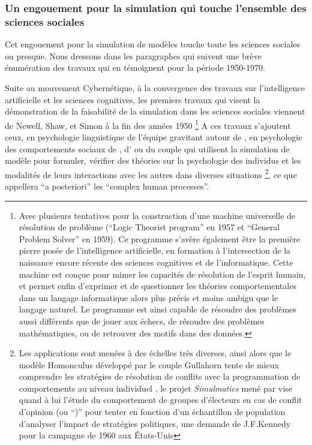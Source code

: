 \subsubsection{Un engouement pour la simulation qui touche l'ensemble des sciences sociales}
\label{ssec:engouement_sciencesociale}

Cet engouement pour la simulation de modèles touche toute les sciences sociales ou presque. Nous dressons dans les paragraphes qui suivent une brève énumération des travaux qui en témoignent pour la période 1950-1970.

Suite au mouvement Cybernétique, à la convergence des travaux sur l'intelligence artificielle et les sciences cognitives, les premiers travaux qui visent la démonstration de la faisabilité de la simulation dans les sciences sociales viennent de Newell, Shaw, et Simon à la fin des années 1950 \autocite{Gullahorn1965} \footnote{Avec plusieurs tentatives pour la construction d'une machine universelle de résolution de problème (\foreignquote{english}{Logic Theorist program} en 1957 et \foreignquote{english}{General Problem Solver} en 1959). Ce programme s'avère également être la première pierre posée de l'intelligence artificielle, en formation à l'intersection de la naissance encore récente des sciences cognitives et de l'informatique. Cette machine est conçue pour mimer les capacités de résolution de l'esprit humain, et permet enfin d'exprimer et de questionner les théories comportementales dans un langage informatique alors plus précis et moins ambigu que le langage naturel. Le programme est ainsi capable de résoudre des problèmes aussi différents que de jouer aux échecs, de résoudre des problèmes mathématiques, ou de retrouver des motifs dans des données.} A ces travaux s'ajoutent ceux, en psychologie linguistique de l'équipe gravitant autour de \textcite[280-416]{Borko1962}, en psychologie des comportements sociaux de \textcite{Hovland1960}, d'\textcite{Abelson1961, Abelson1968} ou du couple \autocite{Gullahorn1965a} qui utilisent la simulation de modèle pour formuler, vérifier des théories sur la psychologie des individus et les modalités de leurs interactions avec les autres dans diverses situations \footnote{Les applications sont menées à des échelles très diverses, ainsi alors que le modèle Homonculus développé par le couple Gullahorn tente de mieux comprendre les stratégies de résolution de conflits avec la programmation de comportements au niveau individuel \autocite{Gullahorn1965}, le projet \textit{Simulmatics} mené par \textcite{Abelson1961} vise quand à lui l'étude du comportement de groupes d'électeurs en cas de conflit d'opinion (ou \foreignquote{cross-pressure}) pour tenter en fonction d'un échantillon de population d'analyser l'impact de stratégies politiques, une demande de J.F.Kennedy pour la campagne de 1960 aux États-Unis}, ce que \textcite{Ostrom1988} appellera \foreignquote{latin}{a posteriori} les \foreignquote{english}{complex human processes}.

